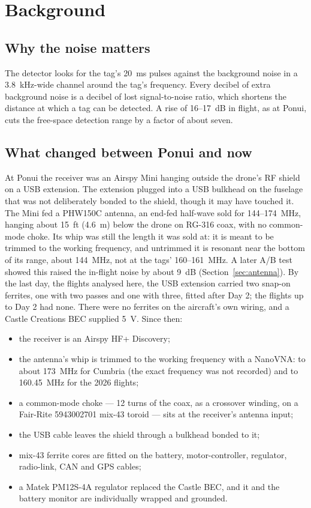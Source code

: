 \documentclass[11pt]{article}
\begin{document}
\section{Background}

\subsection{Why the noise matters}
The detector looks for the tag's 20~ms pulses against the background noise in a 3.8~kHz-wide
channel around the tag's frequency. Every decibel of extra background noise is a decibel of lost
signal-to-noise ratio, which shortens the distance at which a tag can be detected. A rise of
16--17~dB in flight, as at Ponui, cuts the free-space detection range by a factor of about seven.

\subsection{What changed between Ponui and now}
At Ponui the receiver was an Airspy Mini hanging outside the drone's RF shield on a USB extension.
The extension plugged into a USB bulkhead on the fuselage that was not deliberately bonded to the
shield, though it may have touched it. The Mini fed a PHW150C antenna, an end-fed half-wave sold for
144--174~MHz, hanging about 15~ft (4.6~m) below the drone on RG-316 coax, with no common-mode choke.
Its whip was still the length it was sold at: it is meant to be trimmed to the working frequency, and
untrimmed it is resonant near the bottom of its range, about 144~MHz, not at the tags' 160--161~MHz.
A later A/B test showed this raised the in-flight noise by about 9~dB (Section~\ref{sec:antenna}). By the last day, the flights
analysed here, the USB extension carried two snap-on ferrites, one with two passes and one with
three, fitted after Day 2; the flights up to Day 2 had none. There were no ferrites on the aircraft's own wiring,
and a Castle Creations BEC supplied 5~V. Since then:
\begin{itemize}
\item the receiver is an Airspy HF+ Discovery;
\item the antenna's whip is trimmed to the working frequency with a NanoVNA: to about 173~MHz for
Cumbria (the exact frequency was not recorded) and to 160.45~MHz for the 2026 flights;
\item a common-mode choke --- 12 turns of the coax, as a crossover winding, on a Fair-Rite
5943002701 mix-43 toroid --- sits at the receiver's antenna input;
\item the USB cable leaves the shield through a bulkhead bonded to it;
\item mix-43 ferrite cores are fitted on the battery, motor-controller, regulator, radio-link, CAN
and GPS cables;
\item a Matek PM12S-4A regulator replaced the Castle BEC, and it and the battery monitor are
individually wrapped and grounded.
\end{itemize}
\end{document}
